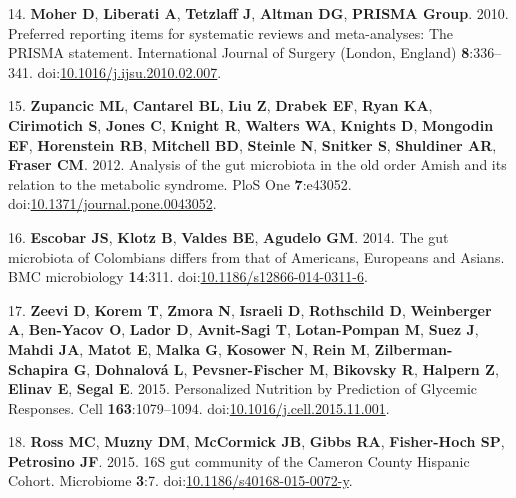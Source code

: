 \documentclass[12pt,]{article}
\begin{document}
\hypertarget{ref-moherux5fpreferredux5f2010}{}
14. \textbf{Moher D}, \textbf{Liberati A}, \textbf{Tetzlaff J},
\textbf{Altman DG}, \textbf{PRISMA Group}. 2010. Preferred reporting
items for systematic reviews and meta-analyses: The PRISMA statement.
International Journal of Surgery (London, England) \textbf{8}:336--341.
doi:\href{https://doi.org/10.1016/j.ijsu.2010.02.007}{10.1016/j.ijsu.2010.02.007}.

\hypertarget{ref-zupancicux5fanalysisux5f2012}{}
15. \textbf{Zupancic ML}, \textbf{Cantarel BL}, \textbf{Liu Z},
\textbf{Drabek EF}, \textbf{Ryan KA}, \textbf{Cirimotich S},
\textbf{Jones C}, \textbf{Knight R}, \textbf{Walters WA},
\textbf{Knights D}, \textbf{Mongodin EF}, \textbf{Horenstein RB},
\textbf{Mitchell BD}, \textbf{Steinle N}, \textbf{Snitker S},
\textbf{Shuldiner AR}, \textbf{Fraser CM}. 2012. Analysis of the gut
microbiota in the old order Amish and its relation to the metabolic
syndrome. PloS One \textbf{7}:e43052.
doi:\href{https://doi.org/10.1371/journal.pone.0043052}{10.1371/journal.pone.0043052}.

\hypertarget{ref-escobarux5fgutux5f2014}{}
16. \textbf{Escobar JS}, \textbf{Klotz B}, \textbf{Valdes BE},
\textbf{Agudelo GM}. 2014. The gut microbiota of Colombians differs from
that of Americans, Europeans and Asians. BMC microbiology
\textbf{14}:311.
doi:\href{https://doi.org/10.1186/s12866-014-0311-6}{10.1186/s12866-014-0311-6}.

\hypertarget{ref-zeeviux5fpersonalizedux5f2015}{}
17. \textbf{Zeevi D}, \textbf{Korem T}, \textbf{Zmora N},
\textbf{Israeli D}, \textbf{Rothschild D}, \textbf{Weinberger A},
\textbf{Ben-Yacov O}, \textbf{Lador D}, \textbf{Avnit-Sagi T},
\textbf{Lotan-Pompan M}, \textbf{Suez J}, \textbf{Mahdi JA},
\textbf{Matot E}, \textbf{Malka G}, \textbf{Kosower N}, \textbf{Rein M},
\textbf{Zilberman-Schapira G}, \textbf{Dohnalová L},
\textbf{Pevsner-Fischer M}, \textbf{Bikovsky R}, \textbf{Halpern Z},
\textbf{Elinav E}, \textbf{Segal E}. 2015. Personalized Nutrition by
Prediction of Glycemic Responses. Cell \textbf{163}:1079--1094.
doi:\href{https://doi.org/10.1016/j.cell.2015.11.001}{10.1016/j.cell.2015.11.001}.

\hypertarget{ref-rossux5f16sux5f2015}{}
18. \textbf{Ross MC}, \textbf{Muzny DM}, \textbf{McCormick JB},
\textbf{Gibbs RA}, \textbf{Fisher-Hoch SP}, \textbf{Petrosino JF}. 2015.
16S gut community of the Cameron County Hispanic Cohort. Microbiome
\textbf{3}:7.
doi:\href{https://doi.org/10.1186/s40168-015-0072-y}{10.1186/s40168-015-0072-y}.
\end{document}
